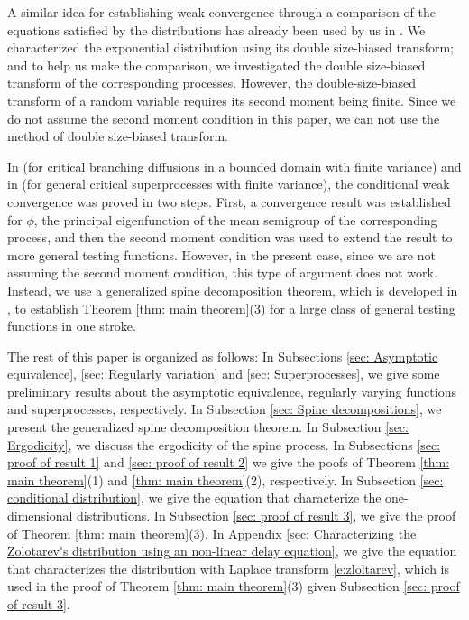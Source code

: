 \documentclass[12pt,a4paper]{amsart}
\theoremstyle{definition}
\numberwithin{equation}{section}
\begin{document}
A similar idea for establishing weak convergence through a comparison of the equations satisfied by the distributions has already been used by us in \cite{RenSongSun2017A-2-spine, RenSongSun2017Spine}.
We characterized the exponential distribution using its double size-biased transform; and to help us make the comparison, we investigated the double size-biased transform of the corresponding processes.
However, the double-size-biased transform of a random variable requires its second moment being finite.
Since we do not assume the second moment condition in this paper, we can not use the method of double size-biased transform.
		
In \cite{Powell2015An-invariance} (for critical branching diffusions in a bounded domain with finite variance) and in \cite{RenSongSun2017Spine, RenSongZhang2015Limit} (for general critical superprocesses with finite variance), the conditional weak convergence was proved in two steps.
First, a convergence result was established for $\phi$, the principal eigenfunction of the mean semigroup of the corresponding process, and then the second moment condition was used to extend the result to more general testing functions.
However, in the present case, since we are not assuming the second moment condition, this type of argument does not work.
Instead, we use a generalized spine decomposition theorem, which is developed in \cite{RenSongSun2017Spine}, to establish Theorem \ref{thm: main theorem}(3) for a large class of general testing functions in one stroke.

The rest of this paper is organized as follows:
In Subsections \ref{sec: Asymptotic equivalence}, \ref{sec: Regularly variation} and \ref{sec: Superprocesses}, we give some preliminary results about the asymptotic equivalence, regularly varying functions and superprocesses, respectively.
In Subsection \ref{sec: Spine decompositions}, we present the generalized spine decomposition theorem.
In Subsection \ref{sec: Ergodicity}, we discuss the ergodicity of the spine process.
In Subsections \ref{sec: proof of result 1} and \ref{sec: proof of result 2} we give the poofs of Theorem \ref{thm: main theorem}(1) and \ref{thm: main theorem}(2), respectively.
In Subsection \ref{sec: conditional distribution}, we give the equation that characterize the one-dimensional distributions.
In Subsection \ref{sec: proof of result 3}, we give the proof of Theorem \ref{thm: main theorem}(3).
In Appendix \ref{sec: Characterizing the Zolotarev's distribution using an non-linear delay equation}, we give the equation that characterizes the distribution with Laplace transform \eqref{e:zloltarev}, which is used in the proof of Theorem \ref{thm: main theorem}(3) given Subsection \ref{sec: proof of result 3}.
\end{document}
